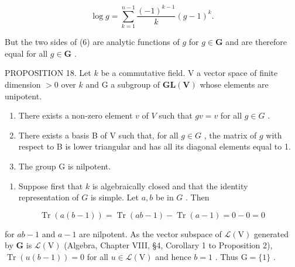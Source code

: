 \[
\log g = \sum_ {k = 1} ^ {n - 1} \frac {(- 1) ^ {k - 1}}{k} (g - 1) ^ {k}.\tag{6}
\]

But the two sides of (6) are analytic functions of \(g\) for \(g \in \mathbf{G}\) and are therefore equal for all \(g \in \mathbf{G}\) .

PROPOSITION 18. Let \(k\) be a commutative field. V a vector space of finite dimension \(>0\) over \(k\) and G a subgroup of \(\mathbf{GL}(\mathbf{V})\) whose elements are unipotent.

\begin{enumerate}
\def\labelenumi{(\roman{enumi})}
\item
  There exists a non-zero element \(v\) of \(V\) such that \(gv = v\) for all \(g \in G\) .
\item
  There exists a basis B of V such that, for all \(g \in G\) , the matrix of \(g\) with respect to B is lower triangular and has all its diagonal elements equal to 1.
\item
  The group G is nilpotent.
\end{enumerate}

\begin{enumerate}
\def\labelenumi{(\alph{enumi})}
\tightlist
\item
  Suppose first that \(k\) is algebraically closed and that the identity representation of \(G\) is simple. Let \(a, b\) be in \(G\) . Then
\end{enumerate}

\[
\operatorname{Tr} (a (b - 1)) = \operatorname{Tr} (a b - 1) - \operatorname{Tr} (a - 1) = 0 - 0 = 0
\]

for \(ab - 1\) and \(a - 1\) are nilpotent. As the vector subspace of \(\mathcal{L}(\mathrm{V})\) generated by \(\mathbf{G}\) is \(\mathcal{L}(\mathrm{V})\) (Algebra, Chapter VIII, §4, Corollary 1 to Proposition 2), \(\operatorname{Tr}(u(b - 1)) = 0\) for all \(u \in \mathcal{L}(\mathrm{V})\) and hence \(b = 1\) . Thus \(\mathrm{G} = \{1\}\) .

